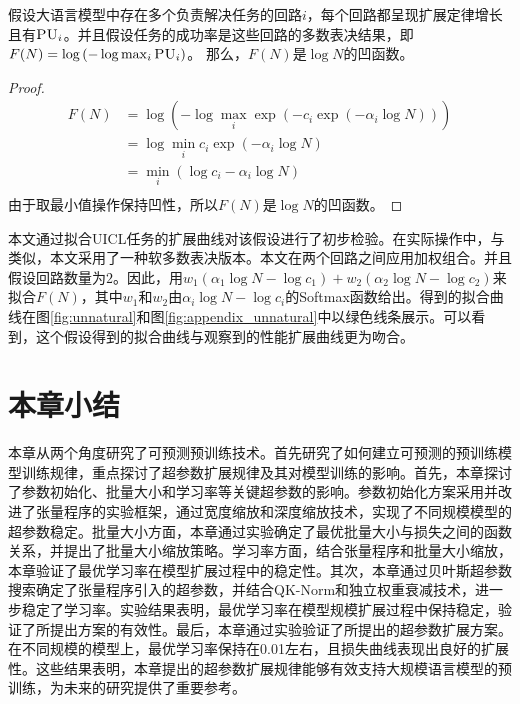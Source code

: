 \begin{theorem}
假设大语言模型中存在多个负责解决任务的回路\(i\)，每个回路都呈现扩展定律增长且有\(\textsc{PU}_i\)。{并且假设}任务的成功率是这些回路的多数表决结果，即\(F(N)  = \operatorname{log}\left(-\operatorname{log}\max_i \textsc{PU}_i\right)\)。
那么，\(F(N)\)是\(\operatorname{log}N\)的凹函数。
\end{theorem}

\begin{proof}
    \begin{equation}
    \label{eq:app_th_2}
    \begin{split}
    F(N) &= \operatorname{log}\left(-\operatorname{log}\max_i \operatorname{exp}\left(- c_i \operatorname{exp}(-\alpha_i \operatorname{log} N)\right)\right) \\
        &= \operatorname{log} \min_i  c_i \operatorname{exp}(-\alpha_i \operatorname{log} N) \\
    &=  \min_i (\operatorname{log} c_i-\alpha_i \operatorname{log} N) \\
    \end{split}
    \end{equation}
    由于取最小值操作保持凹性，所以\(F(N)\)是\(\operatorname{log}N\)的凹函数。 
\end{proof}


本文通过拟合UICL任务的扩展曲线对该假设进行了初步检验。在实际操作中，与\citet{varma2023explaining}类似，本文采用了一种软多数表决版本。本文在两个回路之间应用加权组合。并且假设回路数量为\(2\)。因此，用\({w_1}({\alpha_1}\log N-\log{c_1}) + {w_2}({\alpha_2}\log N - \log c_2)\)来拟合\(F(N)\)，其中\(w_1\)和\(w_2\)由\({\alpha_i}\log N -\log {c_i}\)的Softmax函数给出。得到的拟合曲线在图\ref{fig:unnatural}和图\ref{fig:appendix_unnatural}中以{\color[rgb]{0.3, 0.6, 0.45}绿色}线条展示。可以看到，这个假设得到的拟合曲线与观察到的性能扩展曲线更为吻合。 



\section{本章小结}
本章从两个角度研究了可预测预训练技术。首先研究了如何建立可预测的预训练模型训练规律，重点探讨了超参数扩展规律及其对模型训练的影响。首先，本章探讨了参数初始化、批量大小和学习率等关键超参数的影响。参数初始化方案采用并改进了张量程序的实验框架，通过宽度缩放和深度缩放技术，实现了不同规模模型的超参数稳定。批量大小方面，本章通过实验确定了最优批量大小与损失之间的函数关系，并提出了批量大小缩放策略。学习率方面，结合张量程序和批量大小缩放，本章验证了最优学习率在模型扩展过程中的稳定性。其次，本章通过贝叶斯超参数搜索确定了张量程序引入的超参数，并结合QK-Norm和独立权重衰减技术，进一步稳定了学习率。实验结果表明，最优学习率在模型规模扩展过程中保持稳定，验证了所提出方案的有效性。最后，本章通过实验验证了所提出的超参数扩展方案。在不同规模的模型上，最优学习率保持在0.01左右，且损失曲线表现出良好的扩展性。这些结果表明，本章提出的超参数扩展规律能够有效支持大规模语言模型的预训练，为未来的研究提供了重要参考。

